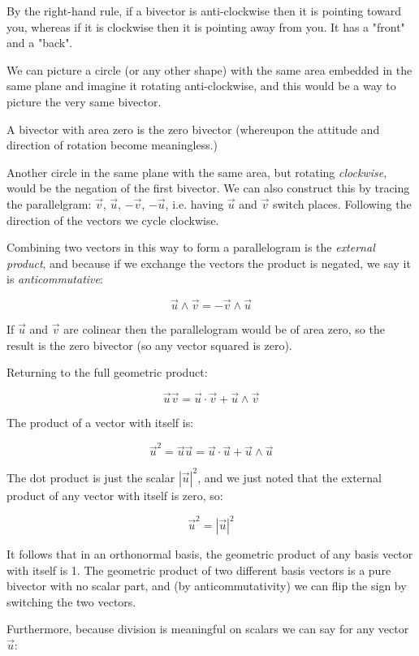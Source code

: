 By the right-hand rule, if a bivector is anti-clockwise then it is pointing toward you, whereas if it is clockwise then it is pointing away from you. It has a "front" and a "back".

We can picture a circle (or any other shape) with the same area embedded in the same plane and imagine it rotating anti-clockwise, and this would be a way to picture the very same bivector.

A bivector with area zero is the zero bivector (whereupon the attitude and direction of rotation become meaningless.)

Another circle in the same plane with the same area, but rotating \textit{clockwise}, would be the negation of the first bivector. We can also construct this by tracing the parallelgram: $\vec{v}$, $\vec{u}$, $-\vec{v}$, $-\vec{u}$, i.e. having $\vec{u}$ and $\vec{v}$ switch places. Following the direction of the vectors we cycle clockwise.

Combining two vectors in this way to form a parallelogram is the \textit{external product}, and because if we exchange the vectors the product is negated, we say it is \textit{anticommutative}:

$$
\vec{u} \wedge \vec{v}
= -\vec{v} \wedge \vec{u}
$$

If $\vec{u}$ and $\vec{v}$ are colinear then the parallelogram would be of area zero, so the result is the zero bivector (so any vector squared is zero).

Returning to the full geometric product:

$$
\vec{u}\vec{v}
=
\vec{u} \cdot
\vec{v}
+
\vec{u}
\wedge
\vec{v}
$$

The product of a vector with itself is:

$$
\vec{u}^2
=\vec{u}\vec{u}
=
\vec{u} \cdot
\vec{u}
+
\vec{u}
\wedge
\vec{u}
$$

The dot product is just the scalar $|\vec{u}|^2$, and we just noted that the external product of any vector with itself is zero, so:

$$\vec{u}^2 = |\vec{u}|^2$$

It follows that in an orthonormal basis, the geometric product of any basis vector with itself is 1. The geometric product of two different basis vectors is a pure bivector with no scalar part, and (by anticommutativity) we can flip the sign by switching the two vectors.

Furthermore, because division is meaningful on scalars we can say for any vector $\vec{u}$:


